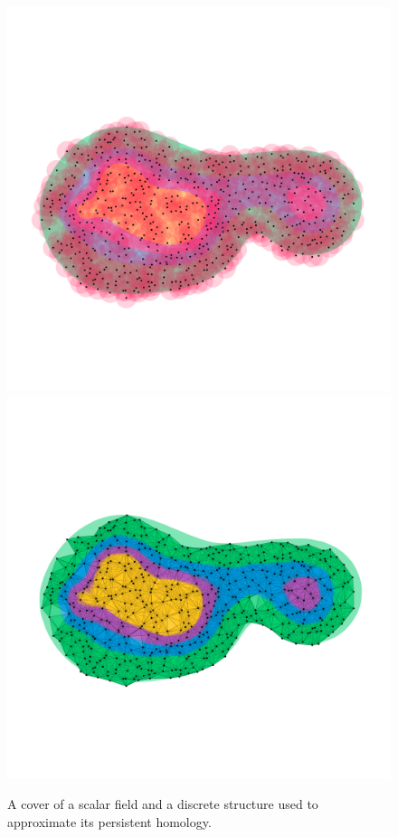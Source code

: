 \begin{figure}
  \centering
  \includegraphics[trim=100 600 100 800, clip, width=\linewidth]{figures/partial3/cover}
  \includegraphics[trim=100 600 100 800, clip, width=\linewidth]{figures/partial3/complex}
  \caption{A cover of a scalar field and a discrete structure used to approximate its persistent homology.}
\end{figure}


